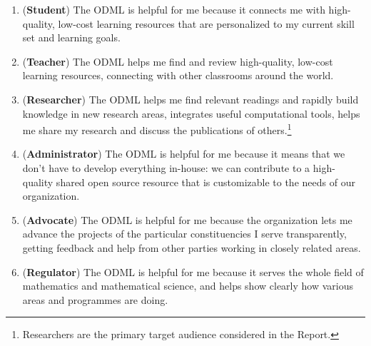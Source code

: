 \documentclass{article}
\begin{document}
\begin{enumerate}
\renewcommand{\theenumi}{\Roman{enumi}}
\item(\textbf{Student})
The ODML is helpful for me because it connects me with high-quality, low-cost learning resources that are personalized to my current skill set and learning goals.\label{student}
\item(\textbf{Teacher})
The ODML helps me find and review high-quality, low-cost learning resources, connecting with other classrooms around the world.\label{teacher}
\item(\textbf{Researcher})
\label{researcher}The ODML helps me find relevant readings and rapidly build knowledge in new research areas, integrates useful computational tools, helps me share my research and discuss the publications of others.\footnote{Researchers are the primary target audience considered in the Report.}
\item(\textbf{Administrator})
The ODML is helpful for me because it means that we don't have to develop everything in-house: we can contribute to a high-quality shared open source resource that is customizable to the needs of our organization.\label{administrator} 
\item(\textbf{Advocate})
The ODML is helpful for me because the organization lets me advance the projects of the particular constituencies I serve transparently, getting feedback and help from other parties working in closely related areas.\label{advocate}
\item(\textbf{Regulator})
The ODML is helpful for me because it serves the whole field of mathematics and mathematical science, and helps show clearly how various areas and programmes are doing.\label{regulator}
\end{enumerate}
\end{document}
